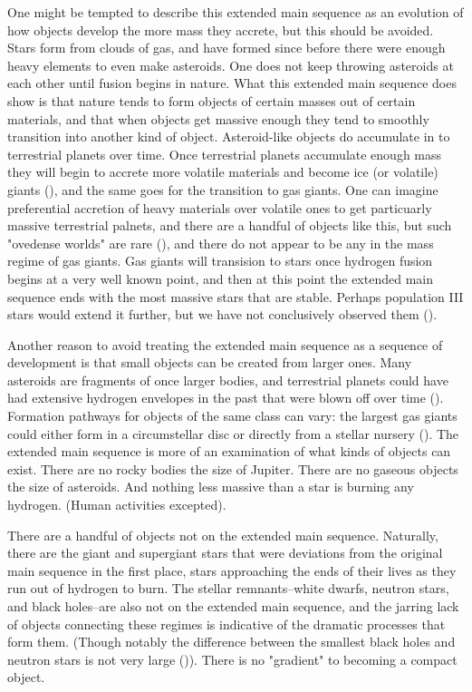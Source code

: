 \documentclass[twocolumn,linenumbers]{aastex631}
\begin{document}
One might be tempted to describe this extended main sequence as an evolution of how objects develop the more mass they accrete, but this should be avoided. Stars form from clouds of gas, and have formed since before there were enough heavy elements to even make asteroids. One does not keep throwing asteroids at each other until fusion begins in nature. What this extended main sequence does show is that nature tends to form objects of certain masses out of certain materials, and that when objects get massive enough they tend to smoothly transition into another kind of object. Asteroid-like objects do accumulate in to terrestrial planets over time. Once terrestrial planets accumulate enough mass they will begin to accrete more volatile materials and become ice (or volatile) giants (), and the same goes for the transition to gas giants. One can imagine preferential accretion of heavy materials over volatile ones to get particuarly massive terrestrial palnets, and there are a handful of objects like this, but such "ovedense worlds" are rare (), and there do not appear to be any in the mass regime of gas giants. Gas giants will transision to stars once hydrogen fusion begins at a very well known point, and then at this point the extended main sequence ends with the most massive stars that are stable. Perhaps population III stars would extend it further, but we have not conclusively observed them (). 

Another reason to avoid treating the extended main sequence as a sequence of development is that small objects can be created from larger ones. Many asteroids are fragments of once larger bodies, and terrestrial planets could have had extensive hydrogen envelopes in the past that were blown off over time (). Formation pathways for objects of the same class can vary: the largest gas giants could either form in a circumstellar disc or directly from a stellar nursery (). The extended main sequence is more of an examination of what kinds of objects can exist. There are no rocky bodies the size of Jupiter. There are no gaseous objects the size of asteroids. And nothing less massive than a star is burning any hydrogen. (Human activities excepted).  

There are a handful of objects not on the extended main sequence. Naturally, there are the giant and supergiant stars that were deviations from the original main sequence in the first place, stars approaching the ends of their lives as they run out of hydrogen to burn. The stellar remnants--white dwarfs, neutron stars, and black holes--are also not on the extended main sequence, and the jarring lack of objects connecting these regimes is indicative of the dramatic processes that form them. (Though notably the difference between the smallest black holes and neutron stars is not very large ()). There is no "gradient" to becoming a compact object. 
\end{document}
